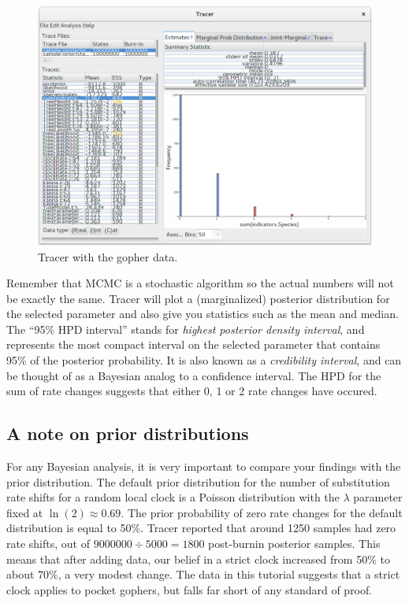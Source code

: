 \documentclass{article}
\begin{document}
\begin{figure}[htb!]
\centering
\includegraphics[width=\textwidth]{figures/tracer-posterior.png}
\caption{Tracer with the gopher data.}
\label{fig:tracer}
\end{figure}

Remember that MCMC is a stochastic algorithm so the actual numbers will not be
exactly the same. Tracer will plot a (marginalized) posterior distribution for
the selected parameter and also give you statistics such as the mean and median.
The ``95\% HPD interval'' stands for \textit{highest posterior density
interval}, and represents the most compact interval on the selected parameter
that contains 95\% of the posterior probability. It is also known as a
\textit{credibility interval}, and can be thought of as a Bayesian analog to a
confidence interval. The HPD for the sum of rate changes suggests that either 0,
1 or 2 rate changes have occured.

\subsection*{A note on prior distributions}

For any Bayesian analysis, it is very important to compare your findings with
the prior distribution. The default prior distribution for the number of
substitution rate shifts for a random local clock is a Poisson distribution
with the $\lambda$ parameter fixed at $\ln(2) \approx 0.69$. The prior
probability of zero rate changes for the default distribution is equal to
50\%. Tracer reported that around 1250 samples had zero rate shifts,
out of $9000000 \div 5000 = 1800$ post-burnin posterior samples. This means that after
adding data, our belief in a strict clock increased from 50\% to about 70\%,
a very modest change. The data in this tutorial suggests that a strict clock
applies to pocket gophers, but falls far short of any standard of proof.
\end{document}
